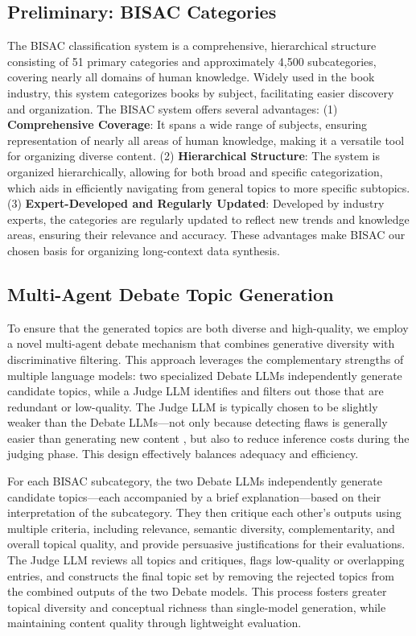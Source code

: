 \documentclass{article}
\theoremstyle{plain}
\theoremstyle{definition}
\theoremstyle{remark}
\begin{document}
\subsection{Preliminary: BISAC Categories}
    The BISAC classification system is a comprehensive, hierarchical structure consisting of 51 primary categories and approximately 4,500 subcategories, covering nearly all domains of human knowledge. Widely used in the book industry, this system categorizes books by subject, facilitating easier discovery and organization. The BISAC system offers several advantages: (1) \textbf{Comprehensive Coverage}: It spans a wide range of subjects, ensuring representation of nearly all areas of human knowledge, making it a versatile tool for organizing diverse content. (2) \textbf{Hierarchical Structure}: The system is organized hierarchically, allowing for both broad and specific categorization, which aids in efficiently navigating from general topics to more specific subtopics. (3) \textbf{Expert-Developed and Regularly Updated}: Developed by industry experts, the categories are regularly updated to reflect new trends and knowledge areas, ensuring their relevance and accuracy. These advantages make BISAC our chosen basis for organizing long-context data synthesis.

\subsection{Multi-Agent Debate Topic Generation}

    To ensure that the generated topics are both diverse and high-quality, we employ a novel multi-agent debate mechanism that combines generative diversity with discriminative filtering. This approach leverages the complementary strengths of multiple language models: two specialized Debate LLMs independently generate candidate topics, while a Judge LLM identifies and filters out those that are redundant or low-quality. The Judge LLM is typically chosen to be slightly weaker than the Debate LLMs—not only because detecting flaws is generally easier than generating new content \cite{kenton2024on}, but also to reduce inference costs during the judging phase. This design effectively balances adequacy and efficiency.

    For each BISAC subcategory, the two Debate LLMs independently generate candidate topics—each accompanied by a brief explanation—based on their interpretation of the subcategory. They then critique each other's outputs using multiple criteria, including relevance, semantic diversity, complementarity, and overall topical quality, and provide persuasive justifications for their evaluations. The Judge LLM reviews all topics and critiques, flags low-quality or overlapping entries, and constructs the final topic set by removing the rejected topics from the combined outputs of the two Debate models. This process fosters greater topical diversity and conceptual richness than single-model generation, while maintaining content quality through lightweight evaluation.    
\end{document}
